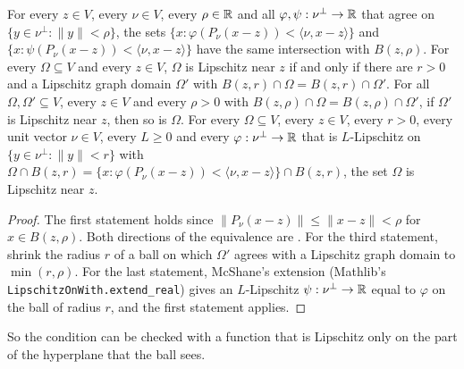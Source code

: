 \begin{theorem}
\label{thm:lipschitz-near-point}
\leanok
{}
For every $z \in V$, every $\nu \in V$, every $\rho \in \mathbb{R}$ and all
$\varphi, \psi : \nu^\perp \to \mathbb{R}$ that agree on $\{y \in \nu^\perp : \|y\| < \rho\}$, the sets
$\{x : \varphi(P_\nu(x - z)) < \langle \nu, x - z \rangle\}$ and
$\{x : \psi(P_\nu(x - z)) < \langle \nu, x - z \rangle\}$ have the same intersection with
$B(z, \rho)$. For every $\Omega \subseteq V$ and every $z \in V$, $\Omega$ is Lipschitz near $z$
if and only if there are $r > 0$ and a Lipschitz graph domain $\Omega'$ with
$B(z, r) \cap \Omega = B(z, r) \cap \Omega'$. For all $\Omega, \Omega' \subseteq V$, every
$z \in V$ and every $\rho > 0$ with $B(z, \rho) \cap \Omega = B(z, \rho) \cap \Omega'$, if
$\Omega'$ is Lipschitz near $z$, then so is $\Omega$. For every $\Omega \subseteq V$, every
$z \in V$,
every $r > 0$, every unit vector $\nu \in V$, every $L \geq 0$ and every
$\varphi : \nu^\perp \to \mathbb{R}$ that is $L$-Lipschitz on $\{y \in \nu^\perp : \|y\| < r\}$ with
$\Omega \cap B(z, r) = \{x : \varphi(P_\nu(x - z)) < \langle \nu, x - z \rangle\} \cap B(z, r)$, the
set $\Omega$ is Lipschitz near $z$.
\end{theorem}

\begin{proof}
\leanok
The first statement holds since $\|P_\nu(x - z)\| \leq \|x - z\| < \rho$ for $x \in B(z, \rho)$.
Both directions of the equivalence are . For the third statement,
shrink the radius $r$ of a ball on which $\Omega'$ agrees with a Lipschitz graph domain to
$\min(r, \rho)$. For the last statement, McShane's extension (Mathlib's
\texttt{LipschitzOnWith.\allowbreak extend\_\allowbreak real}) gives an $L$-Lipschitz
$\psi : \nu^\perp \to \mathbb{R}$ equal to $\varphi$ on the ball of radius $r$, and the first statement
applies.
\end{proof}

So the condition can be checked with a function that is Lipschitz only on the part of the
hyperplane that the ball sees.

